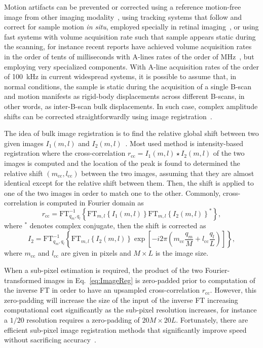 Motion artifacts can be prevented or corrected using a reference motion-free image from other imaging modality~\cite{Ricco2009_Correcting}, using tracking systems that follow and correct for sample motion \textit{in situ}, employed specially in retinal imaging~\cite{Maguluri2007_Three}, or using fast systems with volume acquisition rate such that sample appears static during the scanning, for instance recent reports have achieved volume acquisition rates in the order of tents of milliseconds with A-lines rates of the order of MHz~\cite{Auksorius2020_vivo}, but employing very specialized components. With A-line acquisition rates of the order of 100~kHz in current widespread systems, it is possible to assume that, in normal conditions, the sample is static during the acquisition of a single B-scan and motion manifests as rigid-body displacements across different B-scans, in other words, as inter-B-scan bulk displacements. In such case, complex amplitude shifts can be corrected straightforwardly using image registration~\cite{Zawadzki2007_Correction}.

The idea of bulk image registration is to find the relative global shift between two given images $I_1(m,l)$ and $I_2(m,l)$~\cite{Guizar-Sicairos2008_Efficient}. Most used method is intensity-based registration where the cross-correlation $r_{\text{cc}} = I_1(m,l)\star I_2(m,l)$ of the two images is computed and the location of the peak is found to determined the relative shift $(m_{\text{cc}}, l_{\text{cc}})$ between the two images, assuming that they are almost identical except for the relative shift between them. Then, the shift is applied to one of the two images in order to match one to the other. Commonly, cross-correlation is computed in Fourier domain as 
\begin{equation}\label{eq:ImageReg}
    r_{\text{cc}} = \text{FT}^{-1}_{q_m,q_l}\left\{\text{FT}_{m,l}\left\{I_1(m,l)\right\}\text{FT}_{m,l}\left\{I_2(m,l)\right\}^\ast\right\},
\end{equation}
where $^\ast$ denotes complex conjugate, then the shift is corrected as
\begin{equation}
    I_2 = \text{FT}^{-1}_{q_m,q_l}\left\{\text{FT}_{m,l}\left\{I_2(m,l)\right\} \exp\left[-i2\pi\left(m_{\text{cc}} \frac{q_m}{M} + l_{\text{cc}} \frac{q_l}{L}\right)\right]\right\},
\end{equation}
where $m_{\text{cc}}$ and $l_{\text{cc}}$ are given in pixels and $M\times L$ is the image size.

When a sub-pixel estimation is required, the product of the two Fourier-transformed images in Eq.~\eqref{eq:ImageReg} is zero-padded prior to computation of the inverse FT in order to have an upsampled cross-correlation $r_{\text{cc}}$. However, this zero-padding will increase the size of the input of the inverse FT increasing computational cost significantly as the sub-pixel resolution increases, for instance a $1/20$ resolution requires a zero-padding of $20M\times 20L$. Fortunately, there are efficient sub-pixel image registration methods that significantly improve speed without sacrificing accuracy~\cite{Guizar-Sicairos2008_Efficient}.

